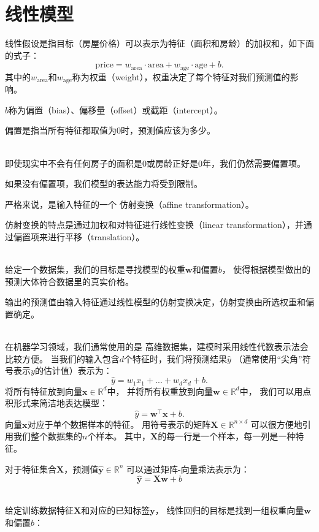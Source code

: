 \documentclass[openany,11pt]{book}
\begin{document}
\chapter{线性模型}


线性假设是指目标（房屋价格）可以表示为特征（面积和房龄）的加权和，如下面的式子：
$$\mathrm{price} = w_{\mathrm{area}} \cdot \mathrm{area} + w_{\mathrm{age}} \cdot \mathrm{age} + b.$$
其中的$w_{\mathrm{area}}$和$w_{\mathrm{age}}$称为权重（weight），权重决定了每个特征对我们预测值的影响。

$b$称为偏置（bias）、偏移量（offset）或截距（intercept）。

偏置是指当所有特征都取值为0时，预测值应该为多少。


~\\
{\color{red} 即使现实中不会有任何房子的面积是0或房龄正好是0年，我们仍然需要偏置项。}

如果没有偏置项，我们模型的表达能力将受到限制。

严格来说，是输入特征的一个 仿射变换（affine transformation）。

仿射变换的特点是通过加权和对特征进行线性变换（linear transformation），并通过偏置项来进行平移（translation）。

~\\
给定一个数据集，我们的目标是寻找模型的权重$\mathbf{w}$和偏置$b$，
使得根据模型做出的预测大体符合数据里的真实价格。

输出的预测值由输入特征通过线性模型的仿射变换决定，仿射变换由所选权重和偏置确定。

~\\
在机器学习领域，我们通常使用的是{\color{red} 高维数据集}，建模时采用线性代数表示法会比较方便。
当我们的输入包含$d$个特征时，我们将预测结果$\hat{y}$
（通常使用“尖角”符号表示$y$的估计值）表示为：
$$\hat{y} = w_1  x_1 + ... + w_d  x_d + b.$$
将所有特征放到向量$\mathbf{x} \in \mathbb{R}^d$中，
并将所有权重放到向量$\mathbf{w} \in \mathbb{R}^d$中，
我们可以用点积形式来简洁地表达模型：
$$\hat{y} = \mathbf{w}^\top \mathbf{x} + b.$$
向量$\mathbf{x}$对应于单个数据样本的特征。
用符号表示的矩阵$\mathbf{X} \in \mathbb{R}^{n \times d}$
可以很方便地引用我们整个数据集的$n$个样本。
其中，$\mathbf{X}$的每一行是一个样本，每一列是一种特征。

对于特征集合$\mathbf{X}$，预测值$\hat{\mathbf{y}} \in \mathbb{R}^n$
可以通过矩阵-向量乘法表示为：
$${\hat{\mathbf{y}}} = \mathbf{X} \mathbf{w} + b$$

~\\
给定训练数据特征$\mathbf{X}$和对应的已知标签$\mathbf{y}$，
线性回归的目标是找到一组权重向量$\mathbf{w}$和偏置$b$：
\end{document}
